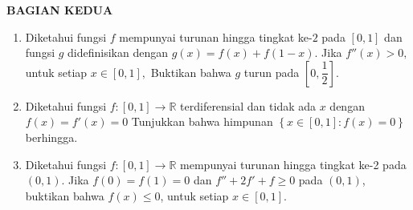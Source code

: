 \documentclass[12pt,twoside]{article}
\begin{document}
\newpage \textbf{BAGIAN KEDUA}
\begin{enumerate}
	\item Diketahui fungsi $f$ mempunyai turunan hingga tingkat ke-$2$ pada $[0,1]$ dan fungsi $g$ didefinisikan dengan $g(x)=f(x)+f(1-x)$. Jika $f''(x)>0,$ untuk setiap $x \in [0,1],$ Buktikan bahwa $g$ turun pada $\left[0,\dfrac{1}{2}\right]$.

	\item Diketahui fungsi $f : [0,1] \to \mathbb{R}$ terdiferensial dan tidak ada $x$ dengan $f(x) = f'(x) = 0$
	      Tunjukkan bahwa himpunan $\left\lbrace x \in [0,1] : f(x) = 0 \right\rbrace$ berhingga.

	\item Diketahui fungsi $f:[0,1] \to \mathbb{R}$ mempunyai turunan hingga tingkat ke-2 pada $(0,1).$ Jika $f(0)=f(1)=0$ dan $f''+2f'+f \geq 0$ pada $(0,1)$, buktikan bahwa $f(x) \leq 0$, untuk setiap $x \in [0,1]$.
\end{enumerate}

\pagebreak
\end{document}
